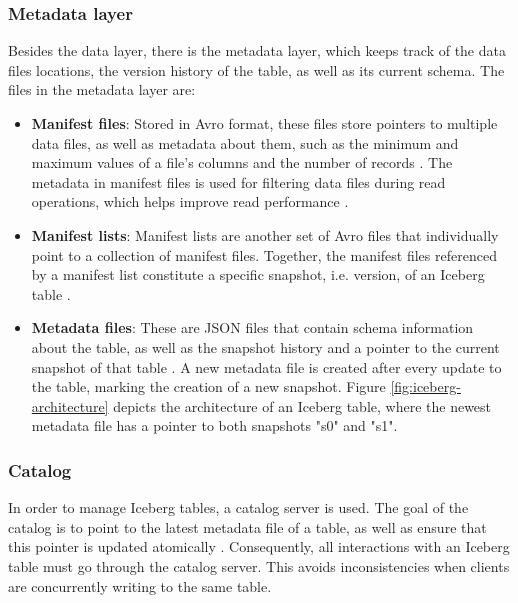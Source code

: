 \subsubsection{Metadata layer}\label{sec:iceberg-metadata}

Besides the data layer, there is the metadata layer, which keeps track of the data files locations, the version history of the table, as well as its current schema. The files in the metadata layer are:

\begin{itemize}
    \item \textbf{Manifest files}: Stored in Avro format, these files store pointers to multiple data files, as well as metadata about them, such as the minimum and maximum values of a file's columns and the number of records \cite{jasonhughesApacheIcebergDefinitive2024}. The metadata in manifest files is used for filtering data files during read operations, which helps improve read performance \cite{jasonhughesApacheIcebergDefinitive2024}.

    \item \textbf{Manifest lists}: Manifest lists are another set of Avro files that individually point to a collection of manifest files. Together, the manifest files referenced by a manifest list constitute a specific snapshot, i.e. version, of an Iceberg table \cite{jasonhughesApacheIcebergDefinitive2024}.

    \item \textbf{Metadata files}: These are JSON files that contain schema information about the table, as well as the snapshot history and a pointer to the current snapshot of that table \cite{jasonhughesApacheIcebergDefinitive2024}. A new metadata file is created after every update to the table, marking the creation of a new snapshot. Figure \ref{fig:iceberg-architecture} depicts the architecture of an Iceberg table, where the newest metadata file has a pointer to both snapshots "s0" and "s1".
\end{itemize}

\subsubsection{Catalog}
In order to manage Iceberg tables, a catalog server is used. The goal of the catalog is to point to the latest metadata file of a table, as well as ensure that this pointer is updated atomically \cite{IcebergSpecOptimistic, jasonhughesApacheIcebergDefinitive2024}. Consequently, all interactions with an Iceberg table must go through the catalog server. This avoids inconsistencies when clients are concurrently writing to the same table.

